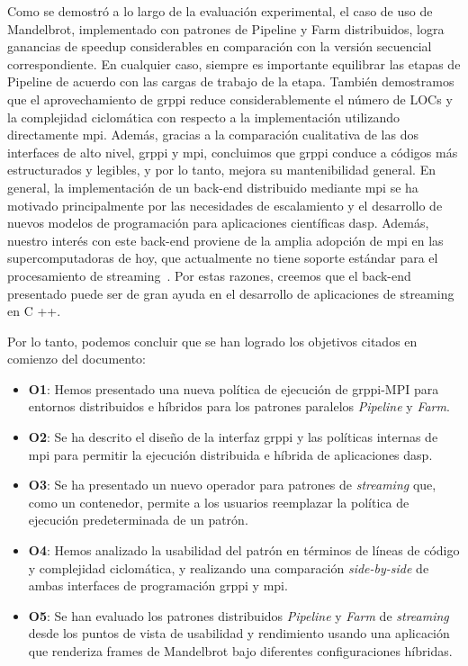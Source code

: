 Como se demostró a lo largo de la evaluación experimental, el caso de uso de Mandelbrot, implementado con patrones de Pipeline y Farm distribuidos, logra ganancias de speedup considerables en comparación con la versión secuencial correspondiente. En cualquier caso, siempre es importante equilibrar las etapas de Pipeline de acuerdo con las cargas de trabajo de la etapa. También demostramos que el aprovechamiento de \acrshort{grppi} reduce considerablemente el número de LOCs y la complejidad ciclomática con respecto a la implementación utilizando directamente \acrshort{mpi}. Además, gracias a la comparación cualitativa de las dos interfaces de alto nivel, \acrshort{grppi} y \acrshort{mpi}, concluimos que \acrshort{grppi} conduce a códigos más estructurados y legibles, y por lo tanto, mejora su mantenibilidad general. En general, la implementación de un back-end distribuido mediante \acrshort{mpi} se ha motivado principalmente por las necesidades de escalamiento y el desarrollo de nuevos modelos de programación para aplicaciones científicas \acrshort{dasp}.  Además, nuestro interés con este back-end proviene de la amplia adopción de \acrshort{mpi} en las supercomputadoras de hoy, que actualmente no tiene soporte estándar para el procesamiento de streaming~\cite{peng2017}. Por estas razones, creemos que el back-end presentado puede ser de gran ayuda en el desarrollo de aplicaciones de streaming en C ++.

Por lo tanto, podemos concluir que se han logrado los objetivos citados en comienzo del documento:

\begin {itemize}
\item \textbf{O1}: Hemos presentado una nueva política de ejecución de \acrshort{grppi}-MPI para entornos distribuidos e híbridos para los patrones paralelos \emph{Pipeline} y \emph{Farm}.
\item \textbf{O2}: Se ha descrito el diseño de la interfaz \acrshort{grppi} y las políticas internas de \acrshort{mpi} para permitir la ejecución distribuida e híbrida de aplicaciones \acrshort{dasp}.
\item \textbf{O3}: Se ha presentado un nuevo operador para patrones de \emph{streaming} que, como un contenedor, permite a los usuarios reemplazar la política de ejecución predeterminada de un patrón.
\item \textbf{O4}: Hemos analizado la usabilidad del patrón en términos de líneas de código y complejidad ciclomática, y realizando una comparación \emph{side-by-side} de ambas interfaces de programación \acrshort{grppi} y \acrshort{mpi}.
\item \textbf{O5}: Se han evaluado los patrones distribuidos \emph{Pipeline} y \emph{Farm} de \emph{streaming} desde los puntos de vista de usabilidad y rendimiento usando una aplicación que renderiza frames de Mandelbrot bajo diferentes configuraciones híbridas.
\end {itemize}

